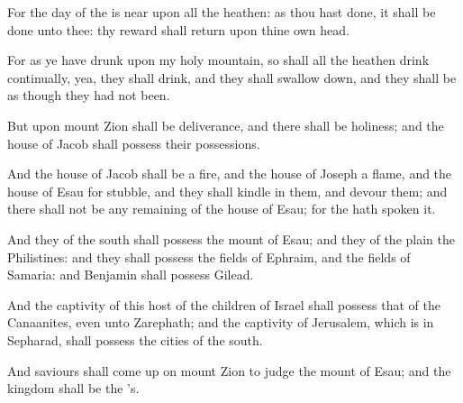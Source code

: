 \Verse For the day of the \LORD is near upon all the heathen: as thou hast done, it shall be done unto thee: thy reward shall return upon thine own head.

\Verse For as ye have drunk upon my holy mountain, so shall all the heathen drink continually, yea, they shall drink, and they shall swallow down, and they shall be as though they had not been.

\Verse But upon mount Zion shall be deliverance, and there shall be holiness; and the house of Jacob shall possess their possessions.

\Verse And the house of Jacob shall be a fire, and the house of Joseph a flame, and the house of Esau for stubble, and they shall kindle in them, and devour them; and there shall not be any remaining of the house of Esau; for the \LORD hath spoken it.

\Verse And they of the south shall possess the mount of Esau; and they of the plain the Philistines: and they shall possess the fields of Ephraim, and the fields of Samaria: and Benjamin shall possess Gilead.

\Verse And the captivity of this host of the children of Israel shall possess that of the Canaanites, even unto Zarephath; and the captivity of Jerusalem, which is in Sepharad, shall possess the cities of the south.

\Verse And saviours shall come up on mount Zion to judge the mount of Esau; and the kingdom shall be the \LORD's.

